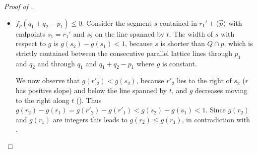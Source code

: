 \documentclass{amsart}
\theoremstyle{plain}
\theoremstyle{definition}
\renewcommand{\vec}[1]{\overrightarrow#1}
\newcommand{\vecline}[1]{\langle \vec #1 \rangle}
\begin{document}
\begin{proof}[Proof of ]
\begin{itemize}
\item \underline{$f_p(q_1+q_2-p_1)\le 0$}.
Consider the segment $s$ contained in $r_1' + \vecline p$ with endpoints $s_1=r_1'$ and $s_2$ on the line spanned by $t$. The width of $s$ with respect to $g$ is $g(s_2)-g(s_1) <1$, because $s$ is shorter than $Q \cap p$, which is strictly contained between the consecutive parallel lattice lines through $p_1$ and $q_2$ and through $q_1$ and $q_1+q_2-p_1$ where $g$ is constant.

We now observe that $g(r'_2) < g(s_2)$, because $r'_2$ lies to the right of $s_2$ ($r$ has positive slope) and below the line spanned by $t$, and $g$ decreases moving to the right along $t$ (). Thus $g(r_2)-g(r_1) = g(r'_2)-g(r'_1) < g(s_2)-g(s_1) <1$. Since $g(r_2)$ and $g(r_1)$ are integers this leads to $g(r_2)\le g(r_1)$, in contradiction with .
\end{itemize}
\end{proof}
\end{document}
